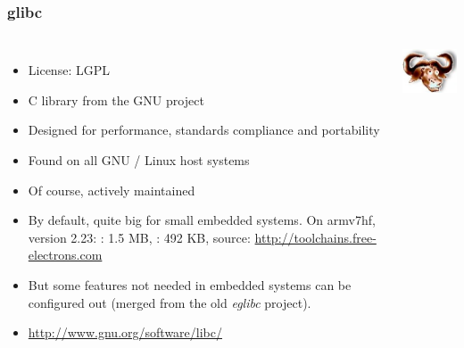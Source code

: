 \begin{frame}
  \frametitle{glibc}
  \begin{columns}
    \begin{itemize}
    \item License: LGPL
    \item C library from the GNU project
    \item Designed for performance, standards compliance and portability
    \item Found on all GNU / Linux host systems
    \item Of course, actively maintained
    \item By default, quite big for small embedded systems.
      On armv7hf, version 2.23: : 1.5 MB, : 492
      KB, source: \url{http://toolchains.free-electrons.com}
    \item But some features not needed in embedded systems can be
          configured out (merged from the old {\em eglibc} project).
    \item \url{http://www.gnu.org/software/libc/}
    \end{itemize}
    \includegraphics[width=\textwidth]{slides/c-libraries/glibc.png}
  \end{columns}
\end{frame}

